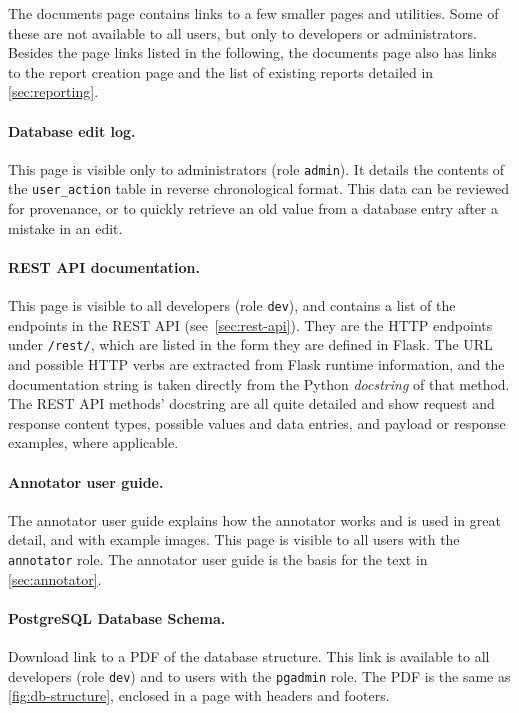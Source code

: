 The documents page contains links to a few smaller pages and utilities.
Some of these are not available to all users, but only to developers or administrators.
Besides the page links listed in the following, the documents page also has links to the report creation page and the list of existing reports detailed in \cref{sec:reporting}.

\paragraph*{Database edit log.}
This page is visible only to administrators (role \verb!admin!).
It details the contents of the \verb!user_action! table in reverse chronological format.
This data can be reviewed for provenance, or to quickly retrieve an old value from a database entry after a mistake in an edit.

\paragraph*{REST API documentation.}
This page is visible to all developers (role \verb!dev!), and contains a list of the endpoints in the REST API (see~\cref{sec:rest-api}).
They are the HTTP endpoints under \verb!/rest/!, which are listed in the form they are defined in Flask.
The URL and possible HTTP verbs are extracted from Flask runtime information, and the documentation string is taken directly from the Python \emph{docstring} of that method.
The REST API methods' docstring are all quite detailed and show request and response content types, possible values and data entries, and payload or response examples, where applicable.

\paragraph*{Annotator user guide.}
The annotator user guide explains how the annotator works and is used in great detail, and with example images.
This page is visible to all users with the \verb!annotator! role.
The annotator user guide is the basis for the text in \cref{sec:annotator}.

\paragraph*{PostgreSQL Database Schema.}
Download link to a PDF of the database structure.
This link is available to all developers (role \verb!dev!) and to users with the \verb!pgadmin! role.
The PDF is the same as \cref{fig:db-structure}, enclosed in a page with headers and footers.

